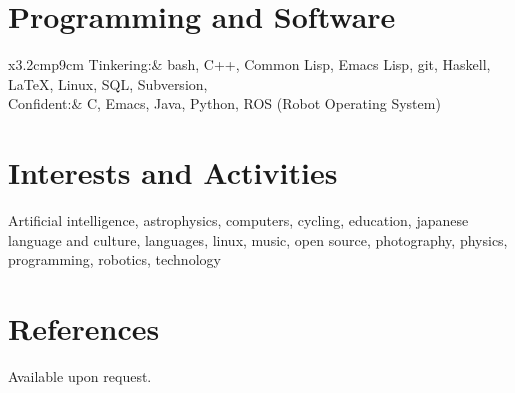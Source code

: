 \documentclass[a4paper,10pt]{article}
\begin{document}
\section{Programming and Software}
\begin{tabular}{x{3.2cm}p{9cm}}
  Tinkering:& bash, C++, Common Lisp, Emacs Lisp, git, Haskell, \LaTeX, Linux, SQL, Subversion, \XeTeX\\
  Confident:& C, Emacs, Java, Python, ROS (Robot Operating System)
\end{tabular}

\section{Interests and Activities}
Artificial intelligence, astrophysics, computers, cycling, education, japanese language and culture, languages, linux, music, open source, photography, physics, programming, robotics, technology
\section{References}
Available upon request.
\end{document}
